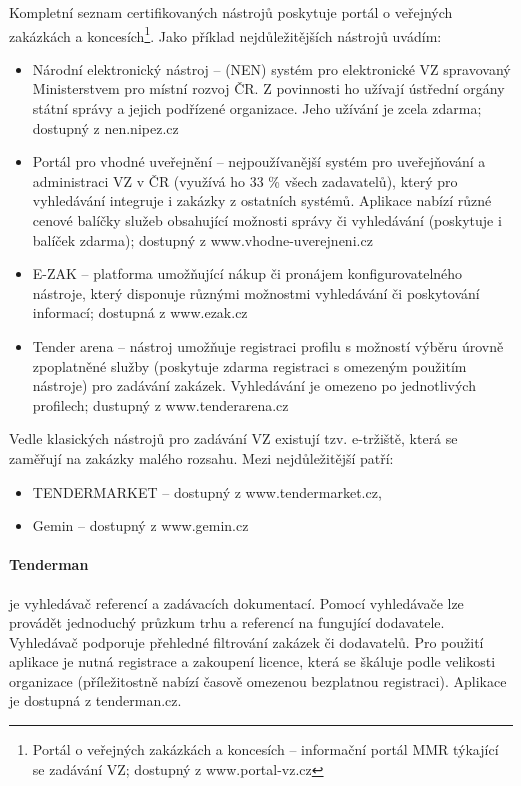 \documentclass[thesis=M,czech]{FITthesis}[2019/12/23]
\begin{document}
Kompletní seznam certifikovaných nástrojů poskytuje portál o veřejných zakázkách a koncesích\footnote{Portál o veřejných zakázkách a koncesích -- informační portál MMR týkající se zadávání VZ; dostupný z www.portal-vz.cz}. Jako příklad nejdůležitějších nástrojů uvádím:
\begin{itemize}
    \item Národní elektronický nástroj -- (NEN) systém pro elektronické VZ spravovaný Ministerstvem pro místní rozvoj ČR. Z povinnosti ho užívají ústřední orgány státní správy a jejich podřízené organizace. Jeho užívání je zcela zdarma; dostupný z nen.nipez.cz
    \item Portál pro vhodné uveřejnění -- nejpoužívanější systém pro uveřejňování a administraci VZ v ČR (využívá ho 33 \% všech zadavatelů)\cite{vhodneuverejneni}, který pro vyhledávání integruje i zakázky z ostatních systémů. Aplikace nabízí různé cenové balíčky služeb obsahující možnosti správy či vyhledávání (poskytuje i balíček zdarma); dostupný z www.vhodne-uverejneni.cz
    \item E-ZAK -- platforma umožňující nákup či pronájem konfigurovatelného nástroje, který disponuje různými možnostmi vyhledávání či poskytování informací; dostupná z www.ezak.cz
    \item Tender arena -- nástroj umožňuje registraci profilu s možností výběru úrovně zpoplatněné služby (poskytuje zdarma registraci s omezeným použitím nástroje) pro zadávání zakázek. Vyhledávání je omezeno po jednotlivých profilech; dustupný z www.tenderarena.cz
\end{itemize}

Vedle klasických nástrojů pro zadávání VZ existují tzv. e-tržiště, která se zaměřují na zakázky malého rozsahu. Mezi nejdůležitější patří:
\begin{itemize}
    \item TENDERMARKET -- dostupný z www.tendermarket.cz,
    \item Gemin -- dostupný z www.gemin.cz
\end{itemize}

\paragraph{Tenderman}
je vyhledávač referencí a zadávacích dokumentací\cite{tenderman}. Pomocí vyhledávače lze provádět jednoduchý průzkum trhu a referencí na fungující dodavatele. Vyhledávač podporuje přehledné filtrování zakázek či dodavatelů. Pro použití aplikace je nutná registrace a zakoupení licence, která se škáluje podle velikosti organizace (příležitostně nabízí časově omezenou bezplatnou registraci). Aplikace je dostupná z tenderman.cz.
\end{document}
